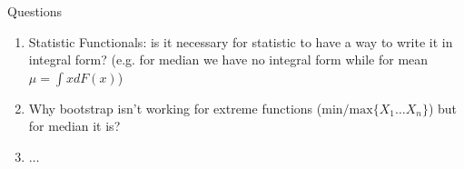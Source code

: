 \documentclass{beamer}          %
\begin{document}
\begin{frame}{Questions}
  \begin{enumerate}
    \item Statistic Functionals: is it necessary for statistic to have a way to write it in integral form?
      (e.g. for median we have no integral form while for mean $\mu = \int x dF(x)$)
    \item Why bootstrap isn't working for extreme functions ($\text{min} / \text{max} \{X_1 \hdots X_n\}$)
      but for median it is?
    \item $\hdots$
  \end{enumerate}
\end{frame}
\end{document}
